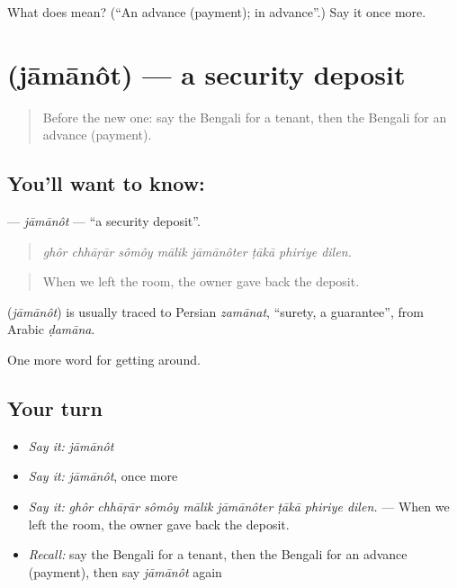 \begin{tcolorbox}[breakable,colback=teal!4,colframe=teal!35!black,title={Before you move on}]
What does  mean? (\textquotedblleft{}An advance (payment); in advance\textquotedblright{}.) Say it once more.
\end{tcolorbox}
\section[\texorpdfstring{\bn{জামানত} (jāmānôt)}{জামানত (jāmānôt)}]{ (jāmānôt) — a security deposit}

\label{lesson:BN-C408-jamanot}



\begin{quote}
Before the new one: say the Bengali for a tenant, then the Bengali for an advance (payment).
\end{quote}

\subsection*{You'll want to know: }
\textbf{} — \emph{jāmānôt} — \textquotedblleft{}a security deposit\textquotedblright{}.

\begin{quote}
       
\end{quote}

\begin{quote}
\emph{ghôr chhāṛār sômôy mālik jāmānôter ṭākā phiriye dilen.}
\end{quote}

\begin{quote}
When we left the room, the owner gave back the deposit.
\end{quote}

\begin{cousinweb}
\textbf{} (\emph{jāmānôt}) is usually traced to Persian \emph{zamānat}, \textquotedblleft{}surety, a guarantee\textquotedblright{}, from Arabic \emph{ḍamāna}.
\end{cousinweb}

\begin{grammarlens}[title={What you've built}]
One more word for getting around.
\end{grammarlens}

\subsection*{Your turn}
\begin{itemize}
\raggedright
  \item \emph{Say it:} \emph{jāmānôt}
  \item \emph{Say it:} \emph{jāmānôt}, once more
  \item \emph{Say it:} \emph{ghôr chhāṛār sômôy mālik jāmānôter ṭākā phiriye dilen.} — When we left the room, the owner gave back the deposit.
  \item \emph{Recall:} say the Bengali for a tenant, then the Bengali for an advance (payment), then say \emph{jāmānôt} again
\end{itemize}

